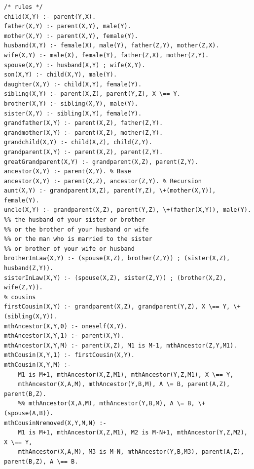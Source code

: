 ﻿\documentclass[a4paper, 11pt]{article}
\begin{document}
\begin{lstlisting}
/* rules */
child(X,Y) :- parent(Y,X).
father(X,Y) :- parent(X,Y), male(Y).
mother(X,Y) :- parent(X,Y), female(Y).
husband(X,Y) :- female(X), male(Y), father(Z,Y), mother(Z,X).
wife(X,Y) :- male(X), female(Y), father(Z,X), mother(Z,Y).
spouse(X,Y) :- husband(X,Y) ; wife(X,Y).
son(X,Y) :- child(X,Y), male(Y).
daughter(X,Y) :- child(X,Y), female(Y).
sibling(X,Y) :- parent(X,Z), parent(Y,Z), X \== Y.
brother(X,Y) :- sibling(X,Y), male(Y).
sister(X,Y) :- sibling(X,Y), female(Y).
grandfather(X,Y) :- parent(X,Z), father(Z,Y).
grandmother(X,Y) :- parent(X,Z), mother(Z,Y).
grandchild(X,Y) :- child(X,Z), child(Z,Y).
grandparent(X,Y) :- parent(X,Z), parent(Z,Y).
greatGrandparent(X,Y) :- grandparent(X,Z), parent(Z,Y).
ancestor(X,Y) :- parent(X,Y). % Base
ancestor(X,Y) :- parent(X,Z), ancestor(Z,Y). % Recursion
aunt(X,Y) :- grandparent(X,Z), parent(Y,Z), \+(mother(X,Y)), female(Y).
uncle(X,Y) :- grandparent(X,Z), parent(Y,Z), \+(father(X,Y)), male(Y).
%% the husband of your sister or brother
%% or the brother of your husband or wife
%% or the man who is married to the sister
%% or brother of your wife or husband
brotherInLaw(X,Y) :- (spouse(X,Z), brother(Z,Y)) ; (sister(X,Z), husband(Z,Y)).
sisterInLaw(X,Y) :- (spouse(X,Z), sister(Z,Y)) ; (brother(X,Z), wife(Z,Y)).
% cousins
firstCousin(X,Y) :- grandparent(X,Z), grandparent(Y,Z), X \== Y, \+(sibling(X,Y)).
mthAncestor(X,Y,0) :- oneself(X,Y).
mthAncestor(X,Y,1) :- parent(X,Y).
mthAncestor(X,Y,M) :- parent(X,Z), M1 is M-1, mthAncestor(Z,Y,M1).
mthCousin(X,Y,1) :- firstCousin(X,Y).
mthCousin(X,Y,M) :-
	M1 is M+1, mthAncestor(X,Z,M1), mthAncestor(Y,Z,M1), X \== Y,
	mthAncestor(X,A,M), mthAncestor(Y,B,M), A \= B, parent(A,Z), parent(B,Z).
	%% mthAncestor(X,A,M), mthAncestor(Y,B,M), A \= B, \+(spouse(A,B)).
mthCousinNremoved(X,Y,M,N) :-
	M1 is M+1, mthAncestor(X,Z,M1), M2 is M-N+1, mthAncestor(Y,Z,M2), X \== Y,
	mthAncestor(X,A,M), M3 is M-N, mthAncestor(Y,B,M3), parent(A,Z), parent(B,Z), A \== B.
\end{lstlisting}
\end{document}
